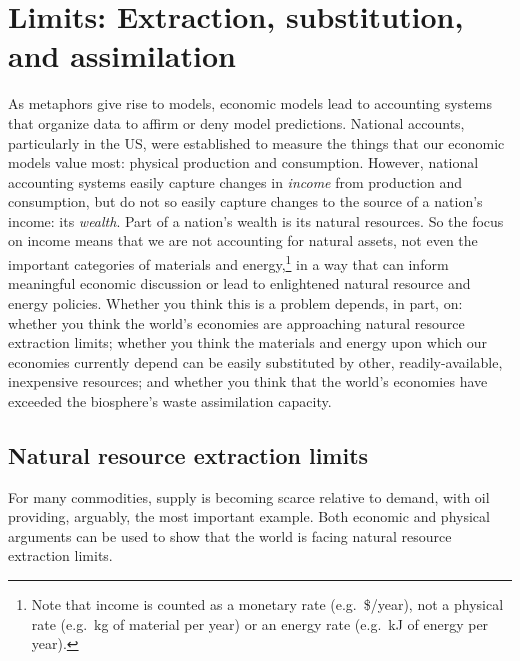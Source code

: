 \section{Limits: Extraction, substitution, and assimilation}
\label{sec:limits}

As metaphors give rise to models, 
economic models lead to accounting systems that organize data
to affirm or deny model predictions.
National accounts, 
particularly in the US, 
were established to measure the things that 
our economic models value most: 
physical production and consumption. 
However, national accounting systems easily capture changes in \emph{income}
from production and consumption, 
but do not so easily capture changes to the source of a nation's income: its \emph{wealth}.
Part of a nation's wealth is its natural resources.
So the focus on income means that we are not accounting for natural assets, 
not even the important categories of materials and energy,\footnote{Note that
	income is counted as a monetary rate (e.g.\ \$/year), 
	not a physical rate (e.g.\ kg of material per year)
	or an energy rate (e.g.\ kJ of energy per year).} 
in a way that can inform meaningful economic discussion or
lead to enlightened natural resource and energy policies.
Whether you think this is a problem depends, in part, on:
whether you think the world's economies are approaching 
	natural resource extraction limits;
whether you think the materials and energy upon which our economies currently depend
	can be easily substituted by other, readily-available, inexpensive resources; and
whether you think that the world's economies have exceeded 
	the biosphere's waste assimilation capacity.


\subsection{Natural resource extraction limits}
\label{sub:natural_resource_extraction_limits}

For many commodities, 
supply is becoming scarce relative to demand, 
with oil providing, arguably, the most important example. 
Both economic and physical arguments can be used to show that the world is facing
natural resource extraction limits.

